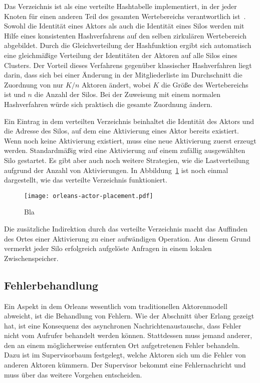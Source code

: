 Das Verzeichnis ist als eine verteilte Hashtabelle implementiert, in der jeder Knoten für einen anderen Teil des gesamten Wertebereichs verantwortlich ist~\cite{Stoica:2001:CSP:383059.383071}. Sowohl die Identität eines Aktors als auch die Identität eines Silos werden mit Hilfe eines konsistenten Hashverfahrens auf den selben zirkulären Wertebereich abgebildet. Durch die Gleichverteilung der Hashfunktion ergibt sich automatisch eine gleichmäßige Verteilung der Identitäten der Aktoren auf alle Silos eines Clusters. Der Vorteil dieses Verfahrens gegenüber klassischer Hashverfahren liegt darin, dass sich bei einer Änderung in der Mitgliederliste im Durchschnitt die Zuordnung von nur $K/n$ Aktoren ändert, wobei $K$ die Größe des Wertebereichs ist und $n$ die Anzahl der Silos. Bei der Zuweisung mit einem normalen Hashverfahren würde sich praktisch die gesamte Zuordnung ändern.

Ein Eintrag in dem verteilten Verzeichnis beinhaltet die Identität des Aktors und die Adresse des Silos, auf dem eine Aktivierung eines Aktor bereits existiert. Wenn noch keine Aktivierung existiert, muss eine neue Aktivierung zuerst erzeugt werden. Standardmäßig wird eine Aktivierung auf einem zufällig ausgewählten Silo gestartet. Es gibt aber auch noch weitere Strategien, wie \zB die Lastverteilung aufgrund der Anzahl von Aktivierungen. In Abbildung~\ref{fig:orleans-acor-placement} ist noch einmal dargestellt, wie das verteilte Verzeichnis funktioniert.

\begin{figure}[!hbt]%
\texttt{[image: orleans-actor-placement.pdf]}%
\caption{Bla}%
\label{fig:orleans-acor-placement}%
\end{figure}

Die zusätzliche Indirektion durch das verteilte Verzeichnis macht das Auffinden des Ortes einer Aktivierung zu einer aufwändigen Operation. Aus diesem Grund vermerkt jeder Silo erfolgreich aufgelöste Anfragen in einem lokalen Zwischenspeicher.

\subsection{Fehlerbehandlung}

Ein Aspekt in dem Orleans wesentlich vom traditionellen Aktorenmodell abweicht, ist die Behandlung von Fehlern. Wie der Abschnitt über Erlang gezeigt hat, ist eine Konsequenz des asynchronen Nachrichtenaustauschs, dass Fehler nicht vom Aufrufer behandelt werden können. Stattdessen muss jemand anderer, den an einem möglicherweise entfernten Ort aufgetretenen Fehler behandeln. Dazu ist im Supervisorbaum festgelegt, welche Aktoren sich um die Fehler von anderen Aktoren kümmern. Der Supervisor bekommt eine Fehlernachricht und muss über das weitere Vorgehen entscheiden.

